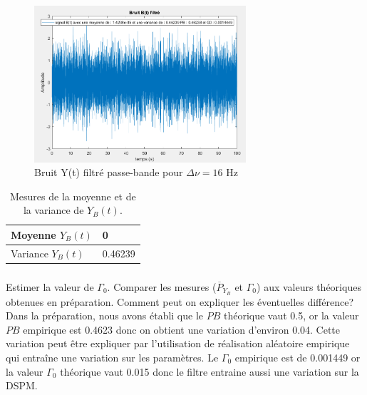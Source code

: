 \documentclass{article}
\newcommand{\dnu}{16}
\begin{document}
\begin{figure}[h]
 \centerline{\includegraphics[width=0.7\textwidth]{images/bruitfiltre.png}}
 \caption{Bruit Y(t) filtré passe-bande pour $\Delta\nu = \dnu$ Hz}
 \label{fig-Y}
\end{figure}

\newpage
\begin{table}[t]
\begin{center}
\begin{tabular}{| L{40mm} | C{40mm}|}\hline
Moyenne $Y_{B}(t)$ 	& { 0 } 	\\[5mm] \hline
Variance $Y_{B}(t)$ &{ 0.46239 }   	\\[5mm] \hline
\end{tabular}
\end{center}
\caption{Mesures de la moyenne et de la variance de $Y_{B}(t)$.}
\label{table-YB}
\end{table}

\subsubsection{}

Estimer la valeur de $\Gamma_0$. Comparer les mesures ($\overline{P}_{Y_B}$ et $\Gamma_0$) aux valeurs théoriques obtenues en préparation. Comment peut on expliquer les éventuelles différence?\\
\newline
Dans la préparation, nous avons établi que le $PB$ théorique vaut 0.5, or la valeur $PB$ empirique est 0.4623 donc on obtient une variation d'environ 0.04. Cette variation peut être expliquer par l'utilisation de réalisation aléatoire empirique qui entraîne une variation sur les paramètres. Le $\Gamma_0$ empirique est de 0.001449 or la valeur $\Gamma_0$ théorique vaut 0.015 donc le filtre entraine aussi une variation sur la DSPM.  
\end{document}
